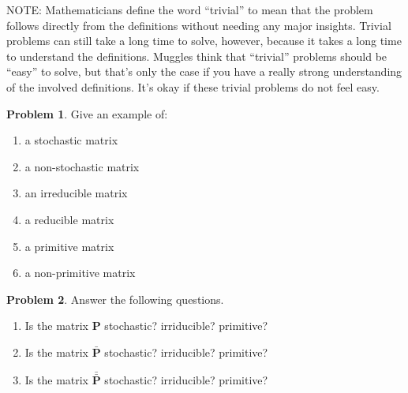 \documentclass[10pt]{article}
\theoremstyle{definition}
\newtheorem{problem}{Problem}
\newcommand{\p}{\mathbf P}
\newcommand{\pb}{\bar {\p}}
\newcommand{\pbb}{\bar {\pb}}
\begin{document}
NOTE:
Mathematicians define the word ``trivial'' to mean that the problem follows directly from the definitions without needing any major insights.
Trivial problems can still take a long time to solve, however, because it takes a long time to understand the definitions.
Muggles think that ``trivial'' problems should be ``easy'' to solve,
but that's only the case if you have a really strong understanding of the involved definitions.
It's okay if these trivial problems do not feel easy.

\begin{problem}
    Give an example of:
    \begin{enumerate}
        \item a stochastic matrix
            \vspace{4in}
        \item a non-stochastic matrix
            \vspace{4in}
            \newpage
        \item an irreducible matrix
            \vspace{4in}
        \item a reducible matrix
            \vspace{4in}
            \newpage
        \item a primitive matrix
            \vspace{4in}
        \item a non-primitive matrix
    \end{enumerate}
\end{problem}

\newpage
\begin{problem}
    Answer the following questions.
    \begin{enumerate}
        \item 
            Is the matrix $\p$ stochastic? irriducible? primitive?
            \vspace{3in}
        \item 
            Is the matrix $\pb$ stochastic? irriducible? primitive?
            \vspace{3in}
        \item 
            Is the matrix $\pbb$ stochastic? irriducible? primitive?
            \vspace{3in}
    \end{enumerate}
\end{problem}
\end{document}
